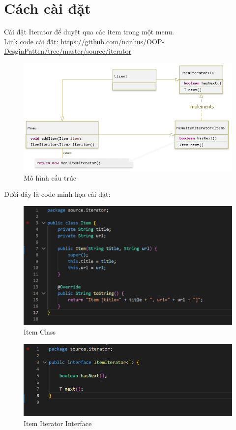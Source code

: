 \section{Cách cài đặt}
Cài đặt Iterator để duyệt qua các item trong một menu.\\
Link code cài đặt:
\url{https://github.com/nanhus/OOP-DesginPatten/tree/master/source/iterator}
\begin{figure}[!htb]
    \centering
    \includegraphics[width=\textwidth]{fig/Iterator/iterator_example.png}
    \caption{Mô hình cấu trúc}
    \label{fig:iterator_example}
\end{figure}
Dưới đây là code minh họa cài đặt:
\begin{figure}[!htb]
    \centering
    \includegraphics[width=\textwidth]{fig/Iterator/item_class.png}
    \caption{Item Class}
    \label{fig:item_class}
\end{figure}
\begin{figure}[!htb]
    \centering
    \includegraphics[width=\textwidth]{fig/Iterator/item_iterator_interface.png}
    \caption{Item Iterator Interface}
    \label{fig:item_iterator_interface}
\end{figure}
